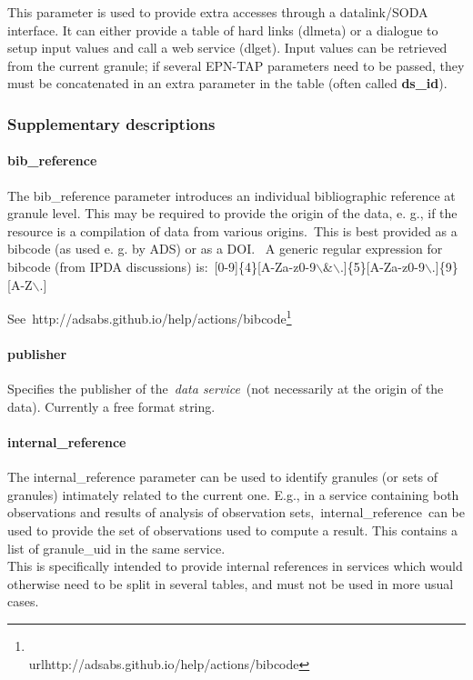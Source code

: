 \documentclass[11pt,a4paper]{ivoa}
\begin{document}
This parameter is used to provide extra accesses through a datalink/SODA interface. It can either provide a table of hard links (dlmeta) or a dialogue to setup input values and call a web service (dlget). Input values can be retrieved from the current granule; if several EPN-TAP parameters need to be passed, they must be concatenated in an extra parameter in the table (often called \textbf{ds\_id}).

\subsubsection{Supplementary descriptions\\}

\paragraph{bib\_reference}

The bib\_reference parameter introduces an individual bibliographic reference at granule level. This may be required to provide the origin of the data, e. g., if the resource is a compilation of data from various origins. This is best provided as a bibcode (as used e. g. by ADS) or as a DOI.  A generic regular expression for bibcode (from IPDA discussions) is: [0-9]\{4\}[A-Za-z0-9$\backslash$\&$\backslash$.]\{5\}[A-Za-z0-9$\backslash$.]\{9\}[A-Z$\backslash$.] 

See http://adsabs.github.io/help/actions/bibcode\footnote{\\url{http://adsabs.github.io/help/actions/bibcode}}

\paragraph{publisher}

Specifies the publisher of the \emph{data service} (not necessarily at the origin of the data). Currently a free format string.\\

\paragraph{internal\_reference}

The internal\_reference parameter can be used to identify granules (or sets of granules) intimately related to the current one. E.g., in a service containing both observations and results of analysis of observation sets, internal\_reference can be used to provide the set of observations used to compute a result. This contains a list of granule\_uid in the same service.\\This is specifically intended to provide internal references in services which would otherwise need to be split in several tables, and must not be used in more usual cases. 
\end{document}
